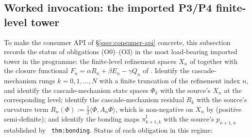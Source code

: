 \documentclass[11pt]{article}
\theoremstyle{definition}
\begin{document}
\subsection{Worked invocation: the imported P3/P4 finite-level tower}\label{ssec:worked-invocation}

To make the consumer API of \S\ref{ssec:consumer-api} concrete, this
subsection records the status of obligations (O0)--(O3) in the most
load-bearing imported tower in the programme: the finite-level
refinement spaces $X_n$ of \cite{CascadeRefinementSpaces} together
with the closure functional
$F_n = \alpha R_n + \beta E_n - \gamma Q_n$ of
\cite{CascadeClosureDynamics}. Identify the cascade-mechanism rungs
$k = 0, 1, \ldots, N$ with a finite truncation of the refinement
index $n$, and identify the cascade-mechanism state spaces $\Phi_k$
with the source's $X_n$ at the corresponding level; identify the
cascade-mechanism residual $R_k$ with the source's curvature term
$R_n(\Phi) := \tfrac{1}{2}\langle \Phi, A_n \Phi \rangle$, which is
non-negative on $X_n$ by \cite{CascadeClosureDynamics} (positive
semi-definite); and identify the bonding maps
$\pi^{\sharp}_{k+1, k}$ with the source's $p_{n+1, n}$ established by
\cite{CascadeRefinementSpaces}~\texttt{thm:bonding}. Status of each
obligation in this regime:
\end{document}

